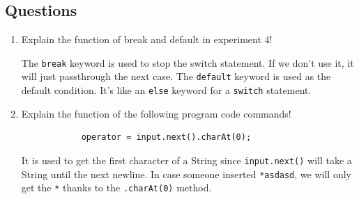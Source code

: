 \documentclass[12pt,titlepage]{article}
\begin{document}
\subsection*{Questions}
\begin{enumerate}
    \item {
        Explain the function of break and default in experiment 4!

        The \texttt{break} keyword is used to stop the switch statement. If we don't use it, it will just passthrough the next case.
        The \texttt{default} keyword is used as the default condition. It's like an \texttt{else} keyword for a \texttt{switch} statement.
    }
    \item {
        Explain the function of the following program code commands!

        \begin{verbatim}
            operator = input.next().charAt(0);
        \end{verbatim}

        It is used to get the first character of a String since \texttt{input.next()} will take a String until the next newline.
        In case someone inserted \texttt{*asdasd}, we will only get the \texttt{*} thanks to the \texttt{.charAt(0)} method.
    }
\end{enumerate}
\pagebreak
\end{document}
